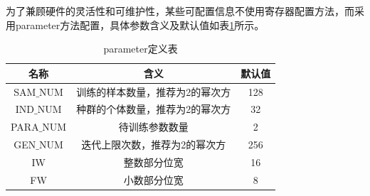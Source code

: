 为了兼顾硬件的灵活性和可维护性，某些可配置信息不使用寄存器配置方法，而采用parameter方法配置，具体参数含义及默认值如表\ref{tab:parameter定义表}所示。
\begin{table}[H]
    \centering
    \caption{parameter定义表}
    \label{tab:parameter定义表}
        \begin{tabular}{c|c|c}
        \hline
        名称          & 含义                            & 默认值     \\ \hline
        SAM$\_$NUM    & 训练的样本数量，推荐为2的幂次方   & 128           \\ \hline
        IND$\_$NUM    & 种群的个体数量，推荐为2的幂次方   & 32            \\ \hline
        PARA$\_$NUM   & 待训练参数数量                  & 2      \\ \hline
        GEN$\_$NUM    & 迭代上限次数，推荐为2的幂次方    & 256       \\ \hline
        IW            & 整数部分位宽                    & 16      \\ \hline
        FW            & 小数部分位宽                    & 8     \\ \hline
    \end{tabular}
  \end{table}

